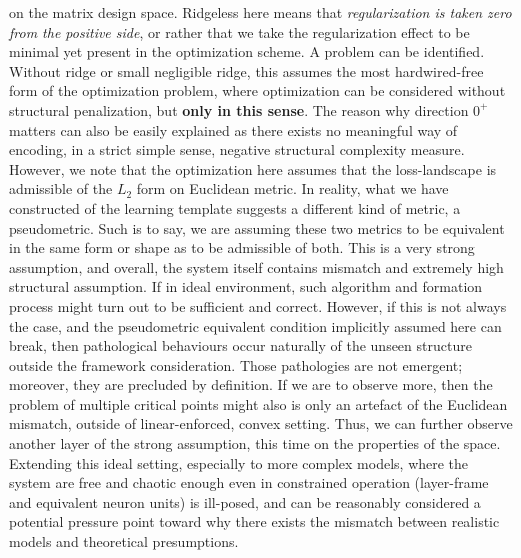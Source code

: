 on the matrix design space. Ridgeless here means that \textit{regularization is taken zero from the positive side}, or rather that we take the regularization effect to be minimal yet present in the optimization scheme. A problem can be identified. Without ridge or small negligible ridge, this assumes the most hardwired-free form of the optimization problem, where optimization can be considered without structural penalization, but \textbf{only in this sense}. The reason why direction $0^{+}$ matters can also be easily explained as there exists no meaningful way of encoding, in a strict simple sense, negative structural complexity measure. However, we note that the optimization here assumes that the loss-landscape is admissible of the $L_{2}$ form on Euclidean metric. In reality, what we have constructed of the learning template suggests a different kind of metric, a pseudometric. Such is to say, we are assuming these two metrics to be equivalent in the same form or shape as to be admissible of both. This is a very strong assumption, and overall, the system itself contains mismatch and extremely high structural assumption. If in ideal environment, such algorithm and formation process might turn out to be sufficient and correct. However, if this is not always the case, and the pseudometric equivalent condition implicitly assumed here can break, then pathological behaviours occur naturally of the unseen structure outside the framework consideration. Those pathologies are not emergent; moreover, they are precluded by definition. If we are to observe more, then the problem of multiple critical points might also is only an artefact of the Euclidean mismatch, outside of linear-enforced, convex setting. Thus, we can further observe another layer of the strong assumption, this time on the properties of the space. Extending this ideal setting, especially to more complex models, where the system are free and chaotic enough even in constrained operation (layer-frame and equivalent neuron units) is ill-posed, and can be reasonably considered a potential pressure point toward why there exists the mismatch between realistic models and theoretical presumptions.

